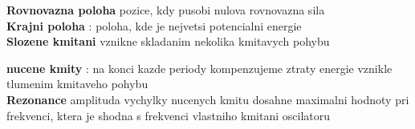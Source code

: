 \documentclass{report}
\newcommand*\diff{\mathop{}\!\mathrm{d}}
\begin{document}

\frm{$E_p=\int F \diff y=\int -ky \diff y = -\frac{1}{2}ky^2$}



\textbf{Rovnovazna poloha} pozice, kdy pusobi nulova rovnovazna sila \\
\textbf{Krajni poloha} : poloha, kde je nejvetsi potencialni energie \\ 
\textbf{Slozene kmitani} vznikne skladanim nekolika kmitavych pohybu

\textbf{nucene kmity} : na konci kazde periody kompenzujeme ztraty energie vznikle tlumenim kmitaveho pohybu \\
\textbf{Rezonance} amplituda vychylky nucenych kmitu dosahne maximalni hodnoty pri frekvenci, ktera je shodna s frekvenci vlastniho kmitani oscilatoru
\newpage
\end{document}
